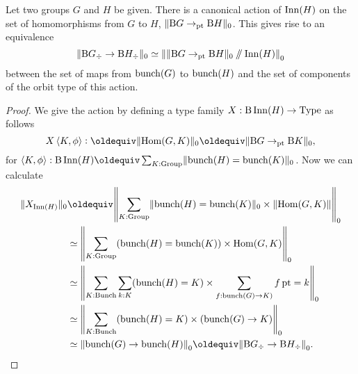 \begin{theorem}
  Let two groups $G$ and $H$ be given.
  There is a canonical action of $\Inn(H)$
  on the set of homomorphisms from $G$ to $H$, $\Trunc{\B G \to_\pt \B H}_0$.
  This gives rise to an equivalence
  \[
    \Trunc{\B G_\div \to \B H_\div}_0 \equiv \Trunc*{\Trunc{\B G \to_\pt \B H}_0 \dblslash \Inn(H)}_0
  \]
  between the set of maps from $\bunch(G)$ to $\bunch(H)$ and the set of
  components of the orbit type of this action.
\end{theorem}
\begin{proof}
  We give the action by defining a type family $X : \B\Inn(H) \to \Type$ as follows
  \[
    X\, \angled{K,\phi} \defeq \Trunc{\Hom(G,K)}_0 \jdeq \Trunc{\B G \to_\pt \B K}_0,
  \]
  for $\angled{K,\phi} : \B\Inn(H) \jdeq \sum_{K : \Group} \Trunc{\bunch(H) = \bunch(K)}_0$.
  Now we can calculate
  \begin{align*}
    \Trunc{X_{\Inn(H)}}_0
    &\jdeq \Trunc*{\sum_{K:\Group}\Trunc{\bunch(H)=\bunch(K)}_0\times\Trunc{\Hom(G,K)}}_0 \\
    &\equiv \Trunc*{\sum_{K:\Group}(\bunch(H)=\bunch(K))\times\Hom(G,K)}_0 \\
    &\equiv \Trunc*{\sum_{K:\Bunch}\sum_{k:K}(\bunch(H)=K)\times\sum_{f:\bunch(G)\to K)}\mathop f \pt = k}_0 \\
    &\equiv \Trunc*{\sum_{K:\Bunch} (\bunch(H)=K) \times(\bunch(G) \to K)}_0 \\
    &\equiv \Trunc*{\bunch(G)\to\bunch(H)}_0 \jdeq \Trunc*{\B G_\div \to \B H_\div}_0.\qedhere
  \end{align*}
\end{proof}

